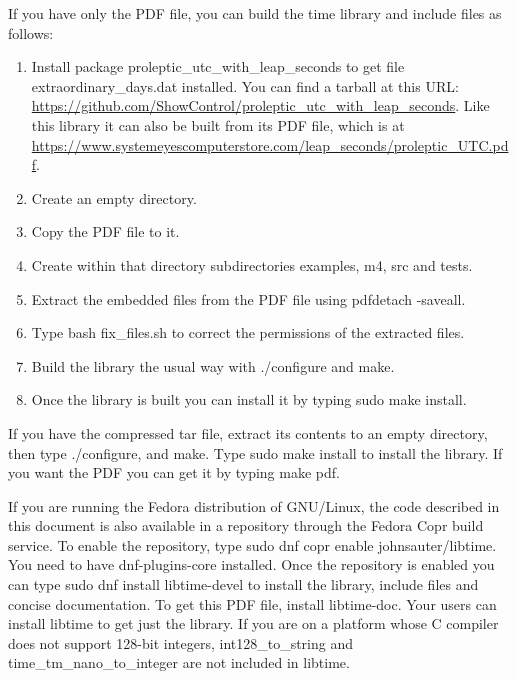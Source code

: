 \documentclass[letterpaper,twoside]{article}
\newcommand{\filename}{\ttfamily\smaller}
\begin{document}
If you have only the PDF file, you can build the time library
and include files as follows:
\begin{enumerate}
\item Install package proleptic\_utc\_with\_leap\_seconds
  to get file {\filename extraordinary\_days.dat} installed.
  You can find a tarball at this URL:
  \href{https://github.com/ShowControl/proleptic_utc_with_leap_seconds}{https://github.com/ShowControl/proleptic\_utc\_with\_leap\_seconds}.
  Like this library it can also be built from its PDF file, which is at
  \href{https://www.systemeyescomputerstore.com/leap\_seconds/proleptic\_UTC.pdf}{https://www.systemeyescomputerstore.com/leap\_seconds/proleptic\_UTC.pdf}.
\item Create an empty directory.
\item Copy the PDF file to it.
\item Create within that directory subdirectories {\filename examples},
{\filename m4}, {\filename src} and {\filename tests}.
\item Extract the embedded files from the PDF file using pdfdetach -saveall.
\item Type {\ttfamily bash fix\_files.sh} to correct the permissions of
  the extracted files.
\item Build the library the usual way with {\ttfamily ./configure}
and {\ttfamily make}.
\item Once the library is built you can install it by typing
{\ttfamily sudo make install}.
\end{enumerate}

If you have the compressed tar file, extract its contents to an empty
directory, then type {\ttfamily ./configure},
and {\ttfamily make}.  Type {\ttfamily sudo make install} to
install the library.  If you want the PDF you can get it by
typing {\ttfamily make pdf}.

If you are running the Fedora distribution of GNU/Linux, the code
described in this document is also available in a repository
through the Fedora Copr build service.  To enable the repository,
type {\ttfamily sudo dnf copr enable johnsauter/libtime}.
You need to have dnf-plugins-core installed.
Once the repository is enabled you can type
{\ttfamily sudo dnf install libtime-devel} to install
the library, include files and concise documentation.
To get this PDF file, install {\ttfamily libtime-doc}.
Your users can install {\ttfamily libtime} to get just
the library.  If you are on a platform whose C compiler does
not support 128-bit integers, {\ttfamily int128\_to\_string}
and {\ttfamily time\_tm\_nano\_to\_integer} are not included
in libtime.
\end{document}
